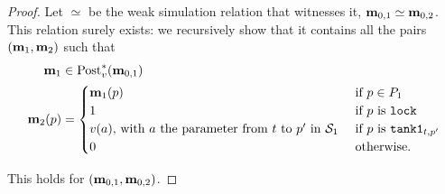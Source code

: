\begin{proof}
  Let $\simeq$ be the weak simulation relation that witnesses it,  $\mathbf{m}_{0,1} \simeq \mathbf{m}_{0,2}$.
  This relation surely exists: we recursively show that it contains all the pairs $(\mathbf{m}_1, \mathbf{m}_2)$ such that
  \begin{align*}
    \mar_1 &\in \posts[\val]{\mar_{0,1}}\\
    \mar_2(p) &= \begin{cases}
        \mar_1(p) &\text{ if } p \in \places_1\\
        1         &\text{ if } p \text{ is } \mathtt{lock} \\
        \val[a]\text{, with $a$ the parameter from $t$ to $p'$ in $\namePPN[1]$} &\text{ if $p$ is }\mathtt{tank1}_{t,p'} \\
        0 &\text{ otherwise.}
      \end{cases}
  \end{align*}

  This holds for $(\mathbf{m}_{0,1}, \mathbf{m}_{0,2})$.


\end{proof}
